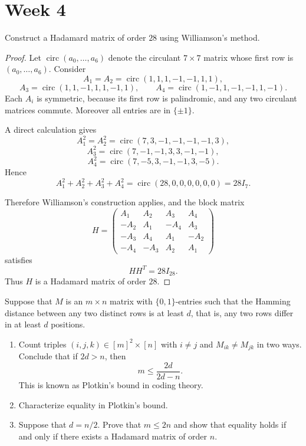\documentclass[11pt, a4paper]{ctexrep}
\begin{document}
\section{Week 4}

\begin{exercise}
    Construct a Hadamard matrix of order $28$ using Williamson's method.
\end{exercise}

\begin{proof}
    Let \(\operatorname{circ}(a_0,\dots,a_6)\) denote the circulant \(7\times 7\) matrix whose first row is
    \((a_0,\dots,a_6)\). Consider
    \[
        A_1=A_2=\operatorname{circ}(1,1,1,-1,-1,1,1),
    \]
    \[
        A_3=\operatorname{circ}(1,1,-1,1,1,-1,1),
        \qquad
        A_4=\operatorname{circ}(1,-1,1,-1,-1,1,-1).
    \]
    Each \(A_i\) is symmetric, because its first row is palindromic, and any two circulant matrices commute.
    Moreover all entries are in \(\{\pm1\}\).

    A direct calculation gives
    \[
        A_1^2=A_2^2=\operatorname{circ}(7,3,-1,-1,-1,-1,3),
    \]
    \[
        A_3^2=\operatorname{circ}(7,-1,-1,3,3,-1,-1),
    \]
    \[
        A_4^2=\operatorname{circ}(7,-5,3,-1,-1,3,-5).
    \]
    Hence
    \[
        A_1^2+A_2^2+A_3^2+A_4^2
        =
        \operatorname{circ}(28,0,0,0,0,0,0)
        =
        28I_7.
    \]

    Therefore Williamson's construction applies, and the block matrix
    \[
        H=
        \begin{pmatrix}
            A_1  & A_2  & A_3  & A_4  \\
            -A_2 & A_1  & -A_4 & A_3  \\
            -A_3 & A_4  & A_1  & -A_2 \\
            -A_4 & -A_3 & A_2  & A_1
        \end{pmatrix}
    \]
    satisfies
    \[
        HH^T=28I_{28}.
    \]
    Thus \(H\) is a Hadamard matrix of order \(28\).
\end{proof}

\begin{exercise}
    Suppose that $M$ is an $m\times n$ matrix with $\{0,1\}$-entries such that the Hamming distance
    between any two distinct rows is at least $d$, that is, any two rows differ in at least
    $d$ positions.
    \begin{enumerate}
        \item[(a)] Count triples $(i,j,k)\in [m]^2\times [n]$ with $i\ne j$ and $M_{ik}\ne M_{jk}$ in two
              ways. Conclude that if $2d>n$, then
              \[
                  m\le \frac{2d}{2d-n}.
              \]
              This is known as Plotkin's bound in coding theory.
        \item[(b)] Characterize equality in Plotkin's bound.
        \item[(c)] Suppose that $d=n/2$. Prove that $m\le 2n$ and show that equality holds if and
              only if there exists a Hadamard matrix of order $n$.
    \end{enumerate}
\end{exercise}
\end{document}
